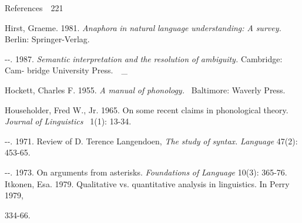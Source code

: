 \clearpage\setcounter{page}{1}\begin{styleStandard}
References\ \ 221
\end{styleStandard}


\begin{styleStandard}
Hirst, Graeme. 1981. \textit{Anaphora}\textit{ }\textit{in}\textit{ }\textit{natural}\textit{ }\textit{language}\textit{ }\textit{understanding: A}\textit{ }\textit{survey.}\textit{ }Berlin: Springer-Verlag.
\end{styleStandard}


\begin{listWWNumviileveli}
\item 
\begin{styleStandard}
{}-{}-. 1987. \textit{Semantic}\textit{ }\textit{interpretation}\textit{ }\textit{and}\textit{ }\textit{the}\textit{ }\textit{resolution}\textit{ }\textit{of}\textit{ }\textit{ambiguity.}\textit{ }Cambridge: Cam- bridge University Press.\ \ \_
\end{styleStandard}


\end{listWWNumviileveli}
\begin{styleStandard}
Hockett, Charles F. 1955. \textit{A}\textit{ }\textit{manual}\textit{ }\textit{of}\textit{ }\textit{phonology. }\textit{\ }Baltimore: Waverly Press.
\end{styleStandard}


\begin{styleStandard}
Householder, Fred W., Jr. 1965. On some recent claims in phonological theory. \textit{Journal}\textit{ }\textit{of}\textit{ }\textit{Linguistics }\textit{\ }1(1): 13-34.
\end{styleStandard}


\begin{listWWNumviileveli}
\item 
\begin{styleStandard}
{}-{}-. 1971. Review of D. Terence Langendoen, \textit{The}\textit{ }\textit{study}\textit{ }\textit{of}\textit{ }\textit{syntax.}\textit{ }\textit{Language}\textit{ }47(2): 453-65.
\end{styleStandard}


\item 
\begin{styleStandard}
{}-{}-. 1973. On arguments from asterisks. \textit{F}\textit{oundations}\textit{ }\textit{of}\textit{ }\textit{Language}\textit{ }10(3): 365{}-76. Itkonen, Esa. 1979. Qualitative vs. quantitative analysis in linguistics. In Perry 1979,
\end{styleStandard}


\end{listWWNumviileveli}
\begin{styleStandard}
334-66.
\end{styleStandard}


